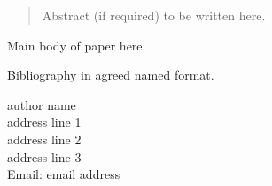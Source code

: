 \documentclass{book}
\begin{document}
\EndPaper




\begin{abstract}
Abstract (if required) to be written here.
\end{abstract}

Main body of paper here.

Bibliography in agreed named format.


\medskip
\noindent author name\\
address line 1\\
address line 2\\
address line 3\\
Email: email address

\EndPaper
\end{document}
